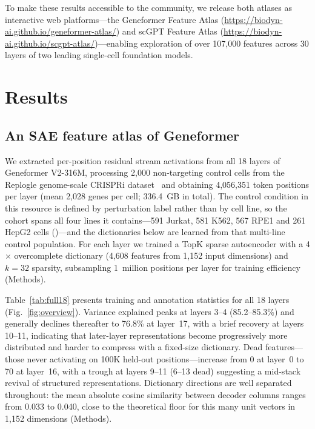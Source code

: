 \documentclass[onecolumn,11pt]{article}
\begin{document}
To make these results accessible to the community, we release both atlases as interactive web
platforms---the Geneformer Feature Atlas
(\url{https://biodyn-ai.github.io/geneformer-atlas/}) and scGPT Feature Atlas
(\url{https://biodyn-ai.github.io/scgpt-atlas/})---enabling exploration of over 107,000 features
across 30 layers of two leading single-cell foundation models.

\section{Results}
\subsection*{An SAE feature atlas of Geneformer}
\label{sec:atlas}

We extracted per-position residual stream activations from all 18 layers of Geneformer V2-316M,
processing 2,000 non-targeting control cells from the Replogle genome-scale CRISPRi
dataset~\cite{replogle2022mapping} and obtaining 4,056,351 token positions per layer (mean 2,028
genes per cell; 336.4~GB in total). The control condition in this resource is defined by
perturbation label rather than by cell line, so the cohort spans all four lines it contains---591
Jurkat, 581 K562, 567 RPE1 and 261 HepG2 cells ()---and the dictionaries
below are learned from that multi-line control population. For each layer we trained a TopK sparse
autoencoder with a
4$\times$ overcomplete dictionary (4,608 features from 1,152 input dimensions) and $k{=}32$
sparsity, subsampling 1~million positions per layer for training efficiency (Methods).

Table~\ref{tab:full18} presents training and annotation statistics for all 18 layers
(Fig.~\ref{fig:overview}). Variance explained peaks at layers 3--4 (85.2--85.3\%) and generally
declines thereafter to 76.8\% at layer~17, with a brief recovery at layers 10--11, indicating that
later-layer representations become progressively more distributed and harder to compress with a
fixed-size dictionary. Dead features---those never activating on 100K held-out positions---increase
from 0 at layer~0 to 70 at layer~16, with a trough at layers 9--11 (6--13 dead) suggesting a
mid-stack revival of structured representations. Dictionary directions are well separated
throughout: the mean absolute cosine similarity between decoder columns ranges from 0.033 to 0.040,
close to the theoretical floor for this many unit vectors in 1,152 dimensions (Methods).
\end{document}
